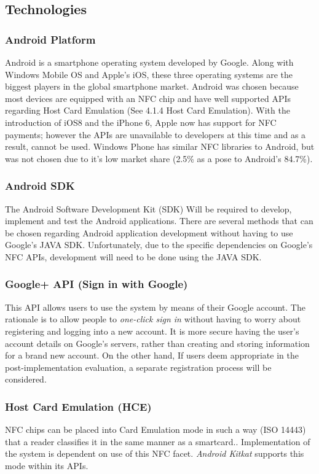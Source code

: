 \subsection{Technologies}
\subsubsection{Android Platform}
Android is a smartphone operating system developed by Google. Along with Windows Mobile OS and Apple's iOS, these three operating systems are the biggest players in the global smartphone market. Android was chosen because most devices are equipped with an NFC chip and have well supported APIs regarding Host Card Emulation (See 4.1.4 Host Card Emulation). With the introduction of iOS8 and the iPhone 6, Apple now has support for NFC payments; however the APIs are unavailable to developers at this time and as a result, cannot be used. Windows Phone has similar NFC libraries to Android, but was not chosen due to it's low market share (2.5\% as a pose to Android's 84.7\%)\cite{marketShare}. 
\subsubsection{Android SDK}
The Android Software Development Kit (SDK) Will be required to develop, implement and test the Android applications. There are several methods that can be chosen regarding Android application development without having to use Google's JAVA SDK. Unfortunately, due to the specific dependencies on Google's NFC APIs, development will need to be done using the JAVA SDK.
\subsubsection{Google+ API (Sign in with Google)}
This API allows users to use the system by means of their Google account. The rationale is to allow people to \emph{one-click sign in} without having to worry about registering and logging into a new account. It is more secure having the user's account details on Google's servers, rather than creating and storing information for a brand new account. On the other hand, If users deem appropriate in the post-implementation evaluation, a separate registration process will be considered.
\subsubsection{Host Card Emulation (HCE)}
NFC chips can be placed into Card Emulation mode in such a way (ISO 14443) that a reader classifies it in the same manner as a smartcard.\cite{ecosystem}. Implementation of the system is dependent on use of this NFC facet. \emph{Android Kitkat} supports this mode within its APIs.
